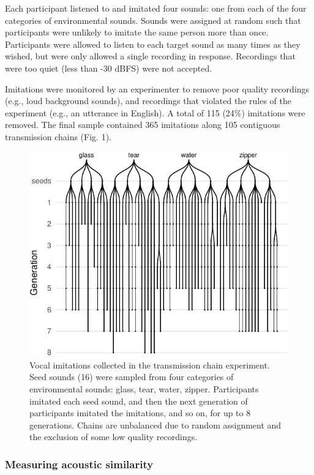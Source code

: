 \documentclass[english,floatsintext,man]{apa6}
\theoremstyle{definition}
\theoremstyle{definition}
\theoremstyle{definition}
\theoremstyle{remark}
\begin{document}
Each participant listened to and imitated four sounds: one from each of
the four categories of environmental sounds. Sounds were assigned at
random such that participants were unlikely to imitate the same person
more than once. Participants were allowed to listen to each target sound
as many times as they wished, but were only allowed a single recording
in response. Recordings that were too quiet (less than -30 dBFS) were
not accepted.

Imitations were monitored by an experimenter to remove poor quality
recordings (e.g., loud background sounds), and recordings that violated
the rules of the experiment (e.g., an utterance in English). A total of
115 (24\%) imitations were removed. The final sample contained 365
imitations along 105 contiguous transmission chains (Fig. 1).

\begin{figure}
\centering
\includegraphics{fig1-1.pdf}
\caption{\label{fig:fig1}Vocal imitations collected in the transmission
chain experiment. Seed sounds (16) were sampled from four categories of
environmental sounds: glass, tear, water, zipper. Participants imitated
each seed sound, and then the next generation of participants imitated
the imitations, and so on, for up to 8 generations. Chains are
unbalanced due to random assignment and the exclusion of some low
quality recordings.}
\end{figure}

\hypertarget{measuring-acoustic-similarity}{%
\subsubsection{Measuring acoustic
similarity}\label{measuring-acoustic-similarity}}
\end{document}
